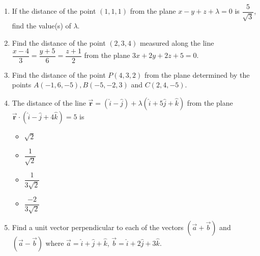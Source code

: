 %
\begin{enumerate}
\item If the distance of the point $(1,1,1)$ from the plane $x-y+z+\lambda=0$ is $\dfrac{5}{\sqrt{3}}$, find the value(s) of $\lambda$.
\vspace{4mm}
\item Find the distance of the point $(2,3,4)$ measured along the line $\dfrac{x-4}{3}=\dfrac{y+5}{6}=\dfrac{z+1}{2}$ from the plane $3x+2y+2z+5=0$.
\vspace{4mm}
\item Find the distance of the point $P(4,3,2)$ from the plane determined by the points $A(-1,6,-5),B(-5,-2,3)$ and $C(2,4,-5)$.
\vspace{4mm}
\item The distance of the line $\overrightarrow{\textbf{r}}=(\hat{i}-\hat{j})+\lambda(\hat{i}+5\hat{j}+\hat{k})$ from the plane $\overrightarrow{\textbf{r}}\cdot(\hat{i}-\hat{j}+4\hat{k})=5$ is
\vspace{2mm}
\begin{itemize}
	\item $\sqrt{2}$
\vspace{2mm}
\item $\dfrac{1}{\sqrt{2}}$
	\vspace{2mm}
\item $\dfrac{1}{3\sqrt{2}}$
\vspace{2mm}
\item $\dfrac{-2}{3\sqrt{2}}$
\end{itemize}
\vspace{4mm}
\item Find a unit vector perpendicular to each of the vectors $(\overrightarrow{a}+\overrightarrow{b})$ and $(\overrightarrow{a}-\overrightarrow{b})$ where $\overrightarrow{a}=\hat{i}+\hat{j}+\hat{k}$, $\overrightarrow{b}=\hat{i}+2\hat{j}+3\hat{k}$.
\end{enumerate}
%

